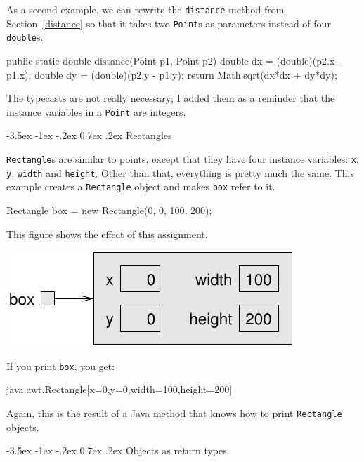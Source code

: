 \documentclass[12pt]{book}
\makeatletter
\renewcommand{\section}{\@startsection {section}{1}{\z@}%
    {-3.5ex \@plus -1ex \@minus -.2ex}%
    {0.7ex \@plus.2ex}%
    {\normalfont\Large\bfseries}}
\theoremstyle{exercise}
\newcommand{\java}[1]{\lstinline{#1}} %
\makeatother
\begin{document}
As a second example, we can rewrite the \java{distance} method from Section~\ref{distance} so that it takes two \java{Point}s as parameters instead of four \java{double}s.

\begin{code}
    public static double distance(Point p1, Point p2) {
        double dx = (double)(p2.x - p1.x);
        double dy = (double)(p2.y - p1.y);
        return Math.sqrt(dx*dx + dy*dy);
    }
\end{code}

The typecasts are not really necessary; I added them as a reminder that the instance variables in a \java{Point} are integers.


\section{Rectangles}


\java{Rectangle}s are similar to points, except that they have four instance variables: \java{x}, \java{y}, \java{width} and \java{height}.
Other than that, everything is pretty much the same.
This example creates a \java{Rectangle} object and makes \java{box} refer to it.

\begin{code}
    Rectangle box = new Rectangle(0, 0, 100, 200);
\end{code}

This figure shows the effect of this assignment.

\includegraphics{figs/rectangle.pdf}

If you print \java{box}, you get:

\begin{stdout}
java.awt.Rectangle[x=0,y=0,width=100,height=200]
\end{stdout}

Again, this is the result of a Java method that knows how to print \java{Rectangle} objects.


\section{Objects as return types}
\end{document}
